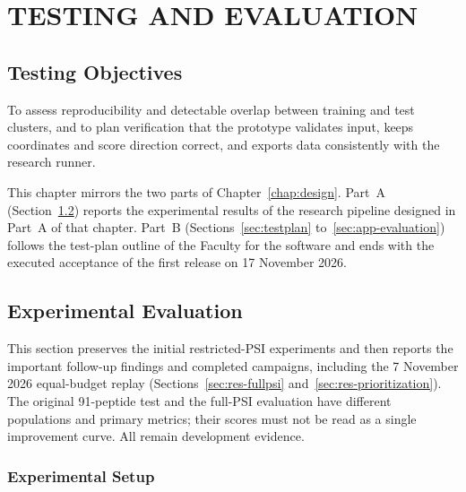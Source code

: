 \chapter{TESTING AND EVALUATION}\label{chap:evaluation}

\section{Testing Objectives}
To assess reproducibility and detectable overlap between training and test clusters, and to plan
verification that the prototype validates input, keeps coordinates and score direction correct, and
exports data consistently with the research runner.

This chapter mirrors the two parts of Chapter~\ref{chap:design}. Part~A
(Section~\ref{sec:experiments}) reports the experimental results of the research pipeline designed in
Part~A of that chapter. Part~B (Sections~\ref{sec:testplan} to~\ref{sec:app-evaluation}) follows the
test-plan outline of the Faculty for the software and ends with the executed acceptance of the first
release on 17 November 2026.


\section{Experimental Evaluation}\label{sec:experiments}
This section preserves the initial restricted-PSI experiments and then reports the important
follow-up findings and completed campaigns, including the 7 November 2026 equal-budget replay
(Sections~\ref{sec:res-fullpsi} and~\ref{sec:res-prioritization}). The original
91-peptide test and the full-PSI evaluation have different populations and primary metrics;
their scores must not be read as a single improvement curve. All remain development evidence.

\subsection{Experimental Setup}

